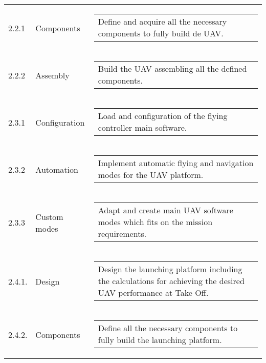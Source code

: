 \begin{longtable}[htb]{@{}lll@{}}
	2.2.1& Components& \begin{tabular}[c]{@{}l@{}}
		\begin{minipage}[t]{0.7\linewidth}
			Define and acquire all the necessary components to fully build de UAV.
		\end{minipage}
	\end{tabular} \\
	2.2.2& Assembly& \begin{tabular}[c]{@{}l@{}}
		\begin{minipage}[t]{0.7\linewidth}
			Build the UAV assembling all the defined components.
		\end{minipage}
	\end{tabular} \\
	2.3.1& Configuration& \begin{tabular}[c]{@{}l@{}}
		\begin{minipage}[t]{0.7\linewidth}
			Load and  configuration of the flying controller main software. 
		\end{minipage}
	\end{tabular} \\
	2.3.2& Automation& \begin{tabular}[c]{@{}l@{}}
		\begin{minipage}[t]{0.7\linewidth}
			Implement automatic flying and navigation modes for the UAV platform.
		\end{minipage}
	\end{tabular} \\
	2.3.3& Custom modes& \begin{tabular}[c]{@{}l@{}}
		\begin{minipage}[t]{0.7\linewidth}
			Adapt and create main UAV software modes which fits on the mission requirements.
		\end{minipage}
	\end{tabular} \\
	2.4.1.& Design& \begin{tabular}[c]{@{}l@{}}
		\begin{minipage}[t]{0.7\linewidth}
			Design the launching platform including the calculations for achieving the desired UAV performance at Take Off.
		\end{minipage}
	\end{tabular} \\
	2.4.2.& Components& \begin{tabular}[c]{@{}l@{}}
		\begin{minipage}[t]{0.7\linewidth}
			Define all the necessary components to fully build the launching platform.

\end{minipage}
\end{tabular}
\end{longtable}
